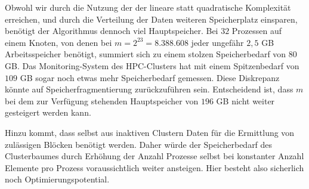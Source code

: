   Obwohl wir durch die Nutzung der der \hquad lineare statt quadratische Komplexität erreichen, und durch die Verteilung der Daten weiteren Speicherplatz einsparen, benötigt der Algorithmus dennoch 
  viel Hauptspeicher. Bei $32$ Prozessen auf einem Knoten, von denen bei $m=2^{23}=8.388.608$ jeder ungefähr $2,5$ GB Arbeitsspeicher benötigt, summiert sich zu einem stolzen Speicherbedarf von
  $80$ GB. Das Monitoring-System des HPC-Clusters hat mit einem Spitzenbedarf von $109$ GB sogar noch etwas mehr Speicherbedarf gemessen. Diese Diskrepanz könnte auf Speicherfragmentierung zurückzuführen
  sein. Entscheidend ist, dass $m$ bei dem zur Verfügung stehenden Hauptspeicher von $196$ GB nicht weiter gesteigert werden kann.
  
  Hinzu kommt, dass selbst aus inaktiven Clustern Daten für die Ermittlung von zulässigen Blöcken benötigt werden. Daher würde der Speicherbedarf des Clusterbaumes durch Erhöhung der Anzahl Prozesse
  selbst bei konstanter Anzahl Elemente pro Prozess voraussichtlich weiter ansteigen.
  Hier besteht also sicherlich noch Optimierungspotential.
  
  